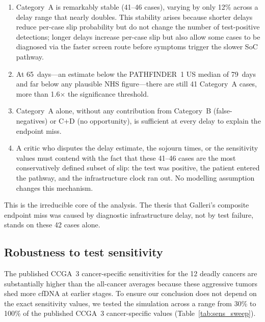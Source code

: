 \documentclass[11pt,letter]{article}
\begin{document}
\begin{enumerate}[nosep]
\item Category~A is remarkably stable (41--46 cases), varying by only
  12\% across a delay range that nearly doubles. This stability arises
  because shorter delays reduce per-case slip probability but do not
  change the number of test-positive detections; longer delays increase
  per-case slip but also allow some cases to be diagnosed via the faster
  screen route before symptoms trigger the slower SoC pathway.

\item At 65~days---an estimate below the PATHFINDER~1 US median of
  79~days and far below any plausible NHS figure---there are still 41
  Category~A cases, more than 1.6$\times$ the significance threshold.

\item Category~A alone, without any contribution from Category~B
  (false-negatives) or C+D (no opportunity), is sufficient at every delay
  to explain the endpoint miss.

\item A critic who disputes the delay estimate, the sojourn times, or the
  sensitivity values must contend with the fact that these 41--46 cases
  are the most conservatively defined subset of slip: the test was
  positive, the patient entered the pathway, and the infrastructure clock
  ran out. No modelling assumption changes this mechanism.
\end{enumerate}

\noindent This is the irreducible core of the analysis. The thesis that
Galleri's composite endpoint miss was caused by diagnostic infrastructure
delay, not by test failure, stands on these 42 cases alone.
\subsection{Robustness to test sensitivity}
\label{sec:sens_robust}

The published CCGA~3 cancer-specific sensitivities for the 12 deadly
cancers are substantially higher than the all-cancer averages because these
aggressive tumors shed more cfDNA at earlier stages. To ensure our
conclusion does not depend on the exact sensitivity values, we tested the
simulation across a range from 30\% to 100\% of the published CCGA~3
cancer-specific values (Table~\ref{tab:sens_sweep}).
\end{document}
